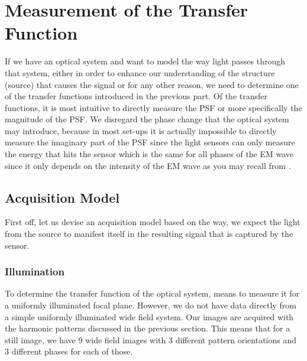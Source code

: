\setchapterpreamble[u]{\margintoc}
\chapter{Measurement of the Transfer Function}

If we have an optical system and want to model the way light passes through that system, either in order to enhance our
    understanding of the structure (source) that causes the signal or for any other reason, we need to determine one of
    the transfer functions introduced in the previous part. %
Of the transfer functions, it is most intuitive to directly measure the \ac{PSF} or more specifically the
    magnitude of the \ac{PSF}.
We disregard the phase change that the optical system may introduce, because in most set-ups it is actually impossible 
    to directly measure the imaginary part of the \ac{PSF} since the light sensors can only measure the energy that hits the sensor which is the same for all phases of the \ac{EM} wave 
    since it only depends on the intensity of the \ac{EM} wave as you may recall from . 

\section{Acquisition Model}%

First off, let us devise an acquisition model based on the way, we expect the light from the source to manifest itself
    in the resulting signal that is captured by the sensor.


\subsection{Illumination}%
To determine the transfer function of the optical system, means to measure it for a uniformly illuminated focal plane.
However, we do not have data directly from a simple uniformly illuminated wide field system.
Our images are acquired with the harmonic patterns discussed in the previous section. %
This means that for a still image, we have 9 wide field images with 3 different pattern 
    orientations and 3 different phases for each of those.


